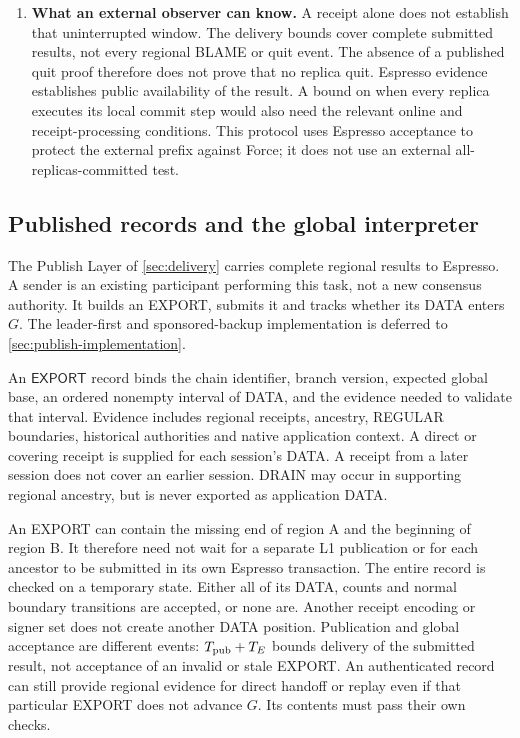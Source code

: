 \documentclass[11pt,a4paper]{article}
\newcommand{\tagg}[1]{\ensuremath{\mathsf{#1}}}
\newcounter{protocol}
\begin{document}
\begin{enumerate}[label=(\arabic*),itemsep=4pt]
\item \textbf{What an external observer can know.} A receipt alone
does not establish that uninterrupted window. The delivery bounds cover
complete submitted results, not every regional BLAME or quit event. The
absence of a published quit proof therefore does not prove that no replica
quit. Espresso evidence establishes public availability of the result.
A bound on when every replica executes its local commit step would also
need the relevant online and receipt-processing conditions. This protocol
uses Espresso acceptance to protect the external prefix against Force;
it does not use an external all-replicas-committed test.
\end{enumerate}



\subsection{Published records and the global interpreter}
\label{sec:exports}
The Publish Layer of \cref{sec:delivery} carries complete regional
results to Espresso. A sender is an existing participant performing this
task, not a new consensus authority. It builds an EXPORT, submits it and
tracks whether its DATA enters $G$. The leader-first and sponsored-backup
implementation is deferred to \cref{sec:publish-implementation}.

An \tagg{EXPORT} record binds the chain identifier, branch version,
expected global base, an ordered nonempty interval of DATA, and the
evidence needed to validate that interval. Evidence includes regional
receipts, ancestry, REGULAR boundaries, historical authorities and
native application context. A direct or covering receipt is supplied
for each session's DATA. A receipt from a later session does not cover
an earlier session. DRAIN may occur in supporting regional ancestry,
but is never exported as application DATA.

An EXPORT can contain the missing end of region A and the beginning
of region B. It therefore need not wait for a separate L1 publication
or for each ancestor to be submitted in its own Espresso transaction.
The entire record is checked on a temporary state. Either all of its
DATA, counts and normal boundary transitions are accepted, or none are.
Another receipt encoding or signer set does not create another DATA
position. Publication and global acceptance are different events:
$T_{\rm pub}+T_E$ bounds delivery of the submitted result, not acceptance
of an invalid or stale EXPORT. An authenticated record can still provide
regional evidence for direct handoff or replay even if that particular
EXPORT does not advance $G$. Its contents must pass their own checks.
\end{document}
